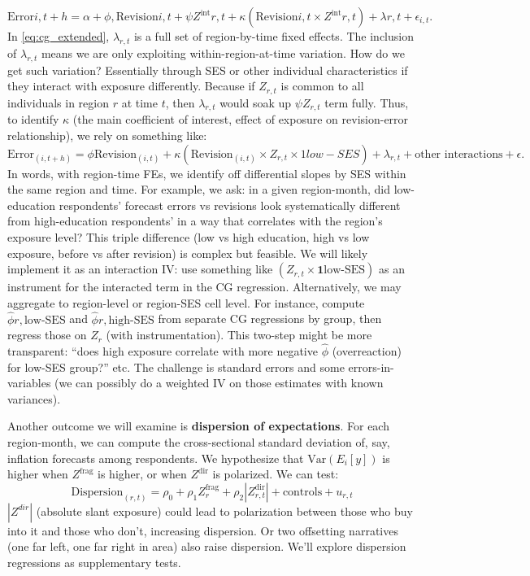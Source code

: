 \documentclass[12pt]{article}
\begin{document}
\begin{equation}
    \label{eq:cg_extended}
    \text{Error}{i,t+h} = \alpha + \phi ,\text{Revision}{i,t} + \psi Z^{\text{int}}{r,t} + \kappa \left(\text{Revision}{i,t} \times Z^{\text{int}}{r,t}\right) + \lambda{r,t} + \epsilon_{i,t}.
\end{equation}
In \eqref{eq:cg_extended}, $\lambda_{r,t}$ is a full set of region-by-time fixed effects. The inclusion of $\lambda_{r,t}$ means we are only exploiting within-region-at-time variation. How do we get such variation? Essentially through SES or other individual characteristics if they interact with exposure differently. Because if $Z_{r,t}$ is common to all individuals in region $r$ at time $t$, then $\lambda_{r,t}$ would soak up $\psi Z_{r,t}$ term fully. Thus, to identify $\kappa$ (the main coefficient of interest, effect of exposure on revision-error relationship), we rely on something like:
$$
    \text{Error}_(i,t+h)=\phi \text{Revision}_(i,t)+ \kappa (\text{Revision}_(i,t) \times Z_{r,t} \times 1{low-SES})+\lambda_{r,t}+\text{other interactions}+\epsilon.
$$
In words, with region-time FEs, we identify off differential slopes by SES within the same region and time. For example, we ask: in a given region-month, did low-education respondents' forecast errors vs revisions look systematically different from high-education respondents' in a way that correlates with the region's exposure level? This triple difference (low vs high education, high vs low exposure, before vs after revision) is complex but feasible. We will likely implement it as an interaction IV: use something like $(Z_{r,t} \times \mathbf{1}{\text{low-SES}})$ as an instrument for the interacted term in the CG regression.
Alternatively, we may aggregate to region-level or region-SES cell level. For instance, compute $\hat{\phi}{r, \text{low-SES}}$ and $\hat{\phi}{r, \text{high-SES}}$ from separate CG regressions by group, then regress those on $Z_r$ (with instrumentation). This two-step might be more transparent: “does high exposure correlate with more negative $\hat{\phi}$ (overreaction) for low-SES group?” etc. The challenge is standard errors and some errors-in-variables (we can possibly do a weighted IV on those estimates with known variances).

Another outcome we will examine is \textbf{dispersion of expectations}. For each region-month, we can compute the cross-sectional standard deviation of, say, inflation forecasts among respondents. We hypothesize that $\text{Var}(E_{i}[y])$ is higher when $Z^{\text{frag}}$ is higher, or when $Z^{\text{dir}}$ is polarized. We can test:
$$
    \text{Dispersion}_(r,t)=\rho_0+\rho_1 Z_r^\text{frag} + \rho_2 |Z_{r,t}^\text{dir}| + \text{controls}+u_{r,t}
$$
$|Z^{dir}|$ (absolute slant exposure) could lead to polarization between those who buy into it and those who don't, increasing dispersion. Or two offsetting narratives (one far left, one far right in area) also raise dispersion. We'll explore dispersion regressions as supplementary tests.
\end{document}
